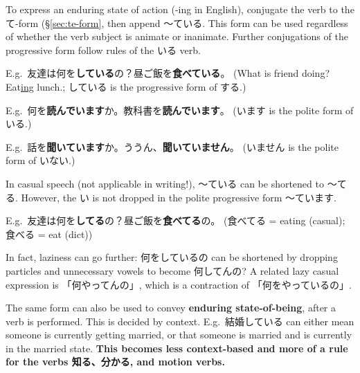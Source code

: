 \documentclass[../nihongo-gakushuu-kyouzai.tex]{subfiles}
\begin{document}
To express an enduring state of action (-ing in English), conjugate the verb to the て-form (\S\ref{sec:te-form}, then append 〜ている. This form can be used regardless of whether the verb subject is animate or inanimate. Further conjugations of the progressive form follow rules of the いる verb.

E.g.\ 友達は何を\textbf{している}の？昼ご飯を\textbf{食べている}。 (What is friend doing? Eat\ul{ing} lunch.; している is the progressive form of する.)

E.g.\ 何を\textbf{読んでいます}か。教科書を\textbf{読んでいます}。 (います is the polite form of いる.)

E.g.\ 話を\textbf{聞いています}か。ううん、\textbf{聞いていません}。 (いません is the polite form of いない.)

In casual speech (not applicable in writing!), 〜ている can be shortened to 〜てる. However, the い is not dropped in the polite progressive form 〜ています. 

E.g.\ 友達は何を\textbf{してる}の？昼ご飯を\textbf{食べてる}の。 (食べてる = eating (casual); 食べる = eat (dict))

In fact, laziness can go further: 何をしているの can be shortened by dropping particles and unnecessary vowels to become 何してんの? A related lazy casual expression is 「何やってんの」, which is a contraction of 「何をやっているの」.

The same form can also be used to convey \textbf{enduring state-of-being}, after a verb is performed. This is decided by context. E.g.\ 結婚している can either mean someone is currently getting married, or that someone is married and is currently in the married state. \textbf{This becomes less context-based and more of a rule for the verbs 知る、分かる, and motion verbs.}
\end{document}
